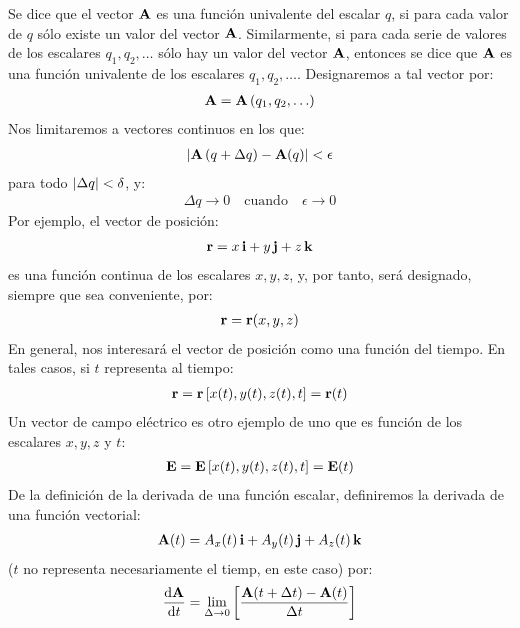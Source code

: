Se dice que el vector $\vb{A}$ es una función univalente del escalar $q$, si para cada valor de $q$ sólo existe un valor del vector $\vb{A}$. Similarmente, si para cada serie de valores de los escalares $q_{1}, q_{2}, \ldots$ sólo hay un valor del vector $\vb{A}$, entonces se dice que $\vb{A}$ es una función univalente de los escalares $q_{1}, q_{2}, \ldots$. Designaremos a tal vector por:
\begin{align*}
    \vb{A} = \vb{A} \left( q_{1}, q_{2}, \ldots \right)
\end{align*}
Nos limitaremos a vectores continuos en los que:
\begin{align*}
    \abs{\vb{A} \left( q + \Delta q \right) - \vb{A} (q)} < \epsilon 
\end{align*}
para todo $\abs{\Delta q} < \delta$, y:
\begin{align*}
     \Delta q \rightarrow 0 \quad \text{cuando} \quad \epsilon \rightarrow 0
\end{align*}
Por ejemplo, el vector de posición:
\begin{align*}
    \vb{r} = x \, \vb{i} + y \, \vb{j} + z \, \vb{k} 
\end{align*}
es una función continua de los escalares $x, y, z$, y, por tanto, será designado, siempre que sea conveniente, por:
\begin{align*}
    \vb{r} = \vb{r} (x, y, z) 
\end{align*}
En general, nos interesará el vector de posición como una función del tiempo. En tales casos, si $t$ representa al tiempo:
\begin{align*}
    \vb{r} = \vb{r} \left[ x (t), y(t), z(t), t \right] = \vb{r}(t)
\end{align*} 
Un vector de campo eléctrico es otro ejemplo de uno que es función de los escalares $x, y, z$ y $t$:
\begin{align*}
    \vb{E} = \vb{E} \left[ x (t), y(t), z(t), t \right] = \vb{E} (t)
\end{align*}
De la definición de la derivada de una función escalar, definiremos la derivada de una función vectorial:
\begin{align*}
    \vb{A} (t) = A_{x} (t) \, \vb{i} + A_{y} (t) \, \vb{j} + A_{z} (t) \, \vb{k}
\end{align*}
($t$ no representa necesariamente el tiemp, en este caso) por:
\begin{align}
    \dv{\vb{A}}{t} = \lim_{\Delta \to 0} \left[ \dfrac{\vb{A} (t + \Delta t) - \vb{A} (t)}{\Delta t} \right]
    \label{eq:ecuacion_01_56}
\end{align}
